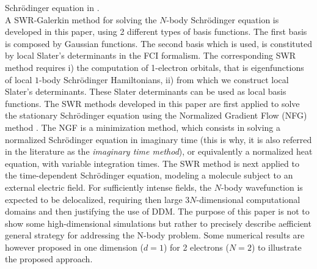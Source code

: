 \documentclass[11pt]{elsarticle}
\begin{document}
Schr\"odinger equation in  \cite{halpern2,jsc,lorin-TBS,lorin-TBS2,AML}.\\
A SWR-Galerkin method for solving the $N$-body Schr\"odinger equation is developed in this paper, using 2 different types of basis functions. The first basis is composed by Gaussian functions. The second basis which is used, is constituted by local Slater's determinants in the FCI formalism. The corresponding SWR method requires i) the computation of 1-electron orbitals, that is eigenfunctions of local $1$-body Schr\"odinger Hamiltonians, ii) from which we construct local Slater's determinants. These Slater determinants can be used as local basis functions. The SWR methods developed in this paper are first applied to solve the stationary Schr\"odinger equation using the Normalized Gradient Flow (NFG) method \cite{bao}. The NGF is a minimization method, which consists in solving a normalized Schr\"odinger equation in imaginary time (this is why, it is also referred in the literature as the {\it imaginary time method}), or equivalently a normalized heat equation, with variable integration times. The SWR method is next applied to the time-dependent Schr\"odinger equation, modeling a molecule subject to an external electric field. For sufficiently intense fields, the $N$-body wavefunction is expected to be delocalized, requiring then large $3N$-dimensional computational domains and then justifying the use of DDM. The purpose of this paper is not to show some high-dimensional simulations but rather to precisely describe aefficient general strategy for addressing the N-body problem. Some numerical results are however proposed in one dimension ($d=1$) for 2 electrons ($N=2$) to illustrate the proposed approach.
\end{document}
